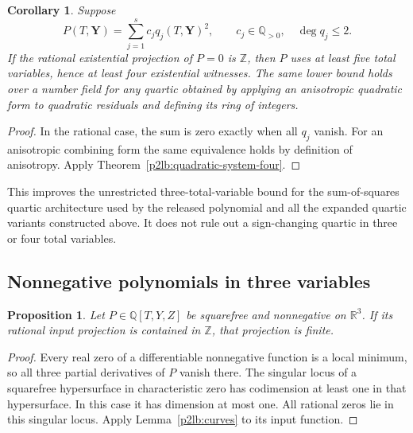 \documentclass[11pt]{article}
\newtheorem{proposition}[theorem]{Proposition}
\newtheorem{corollary}[theorem]{Corollary}
\theoremstyle{definition}
\begin{document}
\begin{corollary}\label{p2lb:sos-five}
Suppose
\[
 P(T,\mathbf Y)=\sum_{j=1}^s c_jq_j(T,\mathbf Y)^2,
 \qquad c_j\in\mathbb Q_{>0},\quad\deg q_j\leq2.
\]
If the rational existential projection of $P=0$ is $\mathbb Z$,
then $P$ uses at least five total variables, hence at least four
existential witnesses.
The same lower bound holds over a number field for any quartic
obtained by applying an anisotropic quadratic form to quadratic
residuals and defining its ring of integers.
\end{corollary}
\begin{proof}
In the rational case, the sum is zero exactly when all $q_j$ vanish.
For an anisotropic combining form the same equivalence holds by
definition of anisotropy.  Apply Theorem~\ref{p2lb:quadratic-system-four}.
\end{proof}

This improves the unrestricted three-total-variable bound for the
sum-of-squares quartic architecture used by the released polynomial
and all the expanded quartic variants constructed above.  It does
not rule out a sign-changing quartic in three or four total variables.

\subsection{Nonnegative polynomials in three variables}

\begin{proposition}\label{p2lb:nonnegative-squarefree}
Let $P\in\mathbb Q[T,Y,Z]$ be squarefree and nonnegative on
$\mathbb R^3$.  If its rational input projection is contained in
$\mathbb Z$, that projection is finite.
\end{proposition}
\begin{proof}
Every real zero of a differentiable nonnegative function is a local
minimum, so all three partial derivatives of $P$ vanish there.
The singular locus of a squarefree hypersurface in characteristic
zero has codimension at least one in that hypersurface.  In this
case it has dimension at most one.  All rational zeros lie in this
singular locus.  Apply Lemma~\ref{p2lb:curves} to its input function.
\end{proof}
\end{document}
